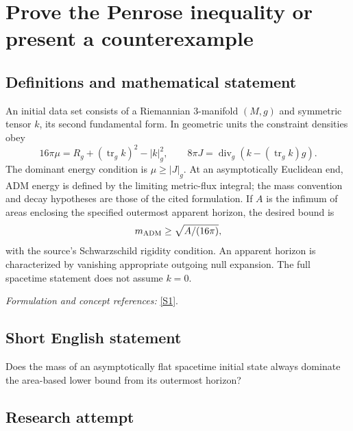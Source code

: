 \documentclass[11pt,a4paper]{article}
\newcommand{\sref}[2]{\hyperlink{source:#1:#2}{[S#2]}}
\newif\ifshowcatalogue
\newcommand{\cataloguescope}[1]{\ifshowcatalogue
 \paragraph{Exact scope in the supplied catalogue.}
 \begin{quote}\small #1\end{quote}\fi}
\numberwithin{equation}{section}
\begin{document}
\setcounter{section}{0}
\clearpage
\section*{\texorpdfstring{Prove the Penrose inequality or present a counterexample}{Prove the Penrose inequality or present a counterexample}}\label{statement}
\subsection{Definitions and mathematical statement}
An initial data set consists of a Riemannian $3$-manifold $(M,g)$ and symmetric tensor $k$, its second fundamental form. In geometric units the constraint densities obey
\[
 16\pi\mu=R_g+(\operatorname{tr}_gk)^2-|k|_g^2,\qquad
 8\pi J=\operatorname{div}_g(k-(\operatorname{tr}_gk)g).
\]
The dominant energy condition is $\mu\ge|J|_g$. At an asymptotically Euclidean end, ADM energy is defined by the limiting metric-flux integral; the mass convention and decay hypotheses are those of the cited formulation. If $A$ is the infimum of areas enclosing the specified outermost apparent horizon, the desired bound is
\[
 m_{\rm ADM}\ge\sqrt{A/(16\pi)},
\]
with the source's Schwarzschild rigidity condition. An apparent horizon is characterized by vanishing appropriate outgoing null expansion. The full spacetime statement does not assume $k=0$.
\par\smallskip\textit{Formulation and concept references:} \sref{statement}{1}.
\cataloguescope{Let (M,g,k) be a three-dimensional asymptotically flat initial data set for the Einstein equations satisfying the dominant energy condition and containing an outermost apparent horizon. If A is the least area needed to enclose that horizon and m\_ADM is the ADM mass, prove the sharp spacetime Penrose inequality m\_ADM >= sqrt(A/(16*pi)), with the appropriate Schwarzschild rigidity statement, or construct initial data satisfying the hypotheses that violate the inequality.}
\subsection{Short English statement}
Does the mass of an asymptotically flat spacetime initial state always dominate the area-based lower bound from its outermost horizon?
\subsection{Research attempt}
\end{document}
